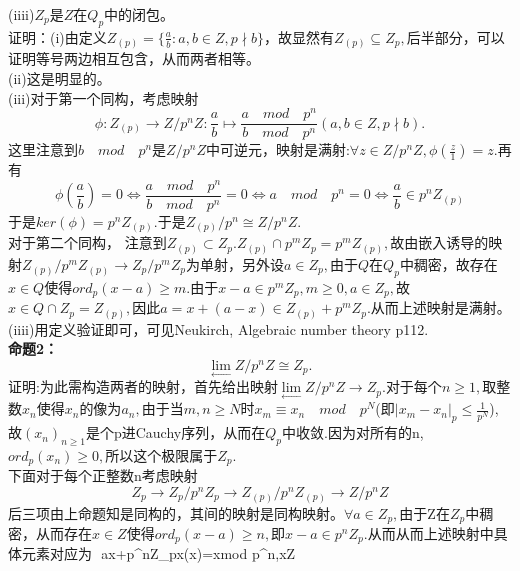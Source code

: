 \documentclass[UTF8]{article}
\begin{document}
  (iiii)$Z_{p}$是$Z$在$Q_{p}$中的闭包。\\
 证明：(i)由定义$Z_{(p)}=\{\frac{a}{b}:a,b\in  Z,p\nmid b\}$，故显然有$Z_{(p)}\subseteq Z_{p},$后半部分，可以证明等号两边相互包含，从而两者相等。\\
 (ii)这是明显的。\\
 (iii)对于第一个同构，考虑映射$$\phi :Z_{(p)}\rightarrow Z/p^{n}Z:\frac{a}{b}\mapsto \frac{a \quad mod \hspace{1em} p^{n} }{b \quad mod \quad p^{n}}(a,b\in Z,p\nmid b).
 $$
 这里注意到$b\quad mod \quad  p^{n}$是$Z/p^{n}Z$中可逆元，映射是满射:$\forall z\in Z/p^{n}Z,\phi(\frac{z}{1})=z.$再有$$
 \phi(\frac{a}{b})=0\iff  \frac{a \quad mod \hspace{1em} p^{n} }{b \quad mod \quad p^{n}}=0\iff a \quad mod \hspace{1em} p^{n}=0\iff \frac{a}{b}\in p^{n}Z_{(p)}
 $$
 于是$ker(\phi)=p^{n}Z_{(p)}.$于是$Z_{(p)}/p^{n}\cong Z/p^{n}Z.$\\
 对于第二个同构，
 注意到$Z_{(p)}\subset Z_{p}.$$Z_{(p)}\cap p^{m}Z_{p}=p^{m}Z_{(p)},$故由嵌入诱导的映射$Z_{(p)}/p^{m}Z_{(p)}\rightarrow Z_{p}/p^{m}Z_{p}$为单射，另外设$a\in Z_{p},$由于$Q$在$Q_{p}$中稠密，故存在$x\in Q$使得$ord_{p}(x-a)\geq m.$由于$x-a\in p^{m}Z_{p},m\geq 0,a\in Z_{p},$故$x\in Q\cap Z_{p}=Z_{(p)},$因此$a=x+(a-x)\in Z_{(p)}+p^{m}Z_{p}.$从而上述映射是满射。\\
 (iiii)用定义验证即可，可见Neukirch, Algebraic number theory p112.\\
 \textbf{命题2：}$$\lim\limits_{\leftarrow}Z/p^{n}Z\cong Z_{p}.$$
 证明:为此需构造两者的映射，首先给出映射$\lim\limits_{\leftarrow}Z/p^{n}Z\rightarrow Z_{p}.$对于每个$n\geq 1,$取整数$x_{n}$使得$x_{n}$的像为$a_{n},$由于当$m,n\geq N$时$x_{m}\equiv x_{n}\quad mod \quad p^{N}$(即$|x_{m}-x_{n}|_{p}\leq \frac{1}{p^{N}}$),故$(x_{n})_{n\geq 1}$是个p进Cauchy序列，从而在$Q_{p}$中收敛.因为对所有的n,$ord_{p}(x_{n})\geq 0,$所以这个极限属于$Z_{p}.$\\
 	下面对于每个正整数n考虑映射
 	$$
 	Z_{p}\rightarrow Z_{p}/p^{n}Z_{p}\rightarrow Z_{(p)}/p^{n}Z_{(p)}\rightarrow Z/p^{n}Z
 	$$
 	后三项由上命题知是同构的，其间的映射是同构映射。$\forall a\in Z_{p},$由于Z在$Z_{p}$中稠密，从而存在$x\in Z$使得$ord_{p}(x-a)\geq n,$即$x-a\in p^{n}Z_{p}.$从而从而上述映射中具体元素对应为
 	$$
 	a\mapsto x+p^{n}Z_{p}\mapsto x\mapsto \phi(x)=x\quad mod \quad p^{n},x\in Z	
\end{document}
